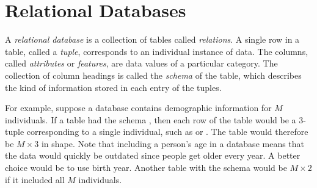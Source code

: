 


\section*{Relational Databases} %

A \emph{relational database} is a collection of tables called \emph{relations}.
A single row in a table, called a \emph{tuple}, corresponds to an individual instance of data.
The columns, called \emph{attributes} or \emph{features}, are data values of a particular category.
The collection of column headings is called the \emph{schema} of the table, which describes the kind of information stored in each entry of the tuples.

For example, suppose a database contains demographic information for $M$ individuals.
If a table had the schema , then each row of the table would be a $3$-tuple corresponding to a single individual, such as  or .
The table would therefore be $M\times 3$ in shape.
Note that including a person's age in a database means that the data would quickly be outdated since people get older every year. 
A better choice would be to use birth year.
Another table with the schema  would be $M \times 2$ if it included all $M$ individuals.

\begin{comment} %
Each table in a relational database must have at least one attribute that \textbf{uniquely} identifies an entry of the data, called a \emph{primary key}.
Most primary keys are ID numbers, but any attribute will do as long as the values are unique for each tuple.
For example, the \li{Name} attribute in the previous example could be considered a primary key provided no two individuals in the database have identical names.
\end{comment}

